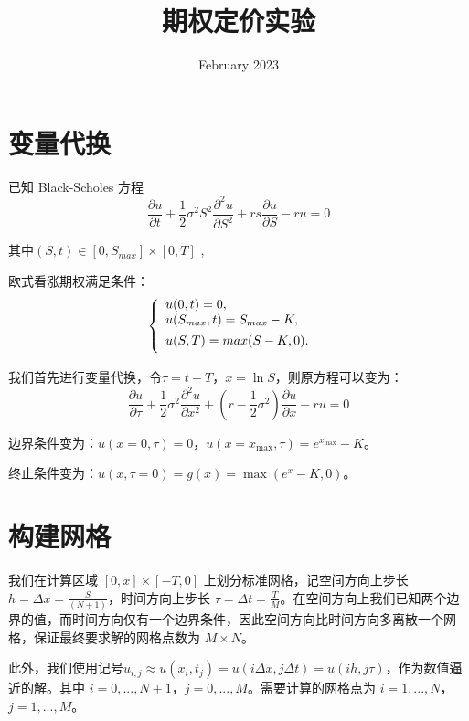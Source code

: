 \documentclass{article}
\title{期权定价实验}
\author{}
\date{February 2023}
\begin{document}
\maketitle


\vspace{2ex}

\section{变量代换}

已知 Black-Scholes 方程
$$\frac{\partial u}{\partial t} + \frac{1}{2}\sigma^2S^2\frac{\partial^2 u}{\partial S^2} + rs\frac{\partial u}{\partial S} - ru = 0$$

其中$(S, t) \in [0, S_{max}] × [0, T]$ ,

欧式看涨期权满足条件：
\begin{equation}
    \left\{
            \begin{array}{lr}
            u(0, t) = 0, & \\
            \vspace{1ex}
            u(S_{max}, t) = S_{max} - K, & \\
            \vspace{1ex}
            u(S, T) = max(S - K, 0). &  
            \end{array}
    \right.
    \nonumber
\end{equation}


\vspace{2ex}

我们首先进行变量代换，令$\tau = t-T$，$x = \ln S$，则原方程可以变为：
$$\frac{\partial u}{\partial \tau} + \frac{1}{2}\sigma^2\frac{\partial^2 u}{\partial x^2} + (r-\frac{1}{2}\sigma^2)\frac{\partial u}{\partial x} - r u = 0$$

边界条件变为：$u(x=0, \tau) = 0$，$u(x=x_{\max}, \tau) = e^{x_{\max}}-K$。

终止条件变为：$u(x,\tau=0) = g(x) = \max(e^x-K,0)$。


\section{构建网格}
我们在计算区域 $[0, x] × [-T, 0]$ 上划分标准网格，记空间方向上步长 $h = \Delta x = \frac{S}{(N + 1)}$，时间方向上步长 $\tau = \Delta t = \frac{T}{M}$。在空间方向上我们已知两个边界的值，而时间方向仅有一个边界条件，因此空间方向比时间方向多离散一个网格，保证最终要求解的网格点数为 $M × N$。

此外，我们使用记号$u_{i,j} \approx u(x_i, t_j) = u(i\Delta x, j\Delta t) = u(ih, j\tau)$，作为数值逼近的解。其中 $i = 0,..., N + 1$，$j = 0,..., M$。需要计算的网格点为 $i = 1,..., N$，$j = 1,..., M$。
\end{document}
